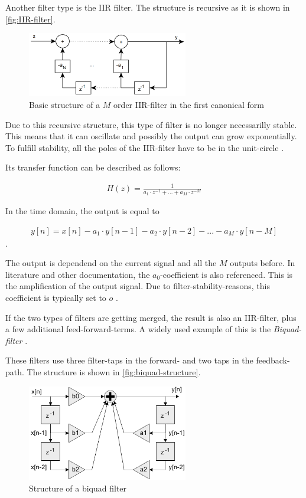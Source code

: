 Another filter type is the \ac{IIR} filter. The structure is recursive as it is shown in \autoref{fig:IIR-filter}.

\begin{figure}[!h]
    \centering
    \includegraphics[width=7cm]{img/iir.png}
    \caption{Basic structure of a $M$ order \ac{IIR}-filter in the first canonical form \cite{meyer_signalverarbeitung}}
    \label{fig:IIR-filter}
\end{figure}

Due to this recursive structure, this type of filter is no longer necessarilly stable. This means that it can
oscillate and possibly the output can grow exponentially. To fulfill stability, all the poles of the
\ac{IIR}-filter have to be in the unit-circle \cite{meyer_signalverarbeitung}.

Its transfer function can be described as follows:

\begin{align}
    H(z) = \frac{1}{a_1 \cdot z^{-1} + ... + a_M \cdot z^{-M}}
\end{align}

In the time domain, the output is equal to

\begin{align}
    y[n] = x[n] - a_1 \cdot y[n-1] - a_2 \cdot y[n-2] - ... - a_M \cdot y[n-M]
\end{align}
.

The output is dependend on the current signal and all the $M$ outputs before. In literature and other documentation,
the $a_0$-coefficient is also referenced. This is the amplification of the output signal. Due to filter-stability-reasons,
this coefficient is typically set to $o$ \cite{arm_dsp} \cite{cookbook_audio}.

If the two types of filters are getting merged, the result is also an \ac{IIR}-filter, plus
a few additional feed-forward-terms. A widely used example of this is the \textit{Biquad-filter} \cite{arm_dsp}.

These filters use three filter-taps in the forward- and two taps in the feedback-path. The structure
is shown in \autoref{fig:biquad-structure}.

\begin{figure}[!h]
    \centering
    \includegraphics[width=7cm]{img/biquad_structure.png}
    \caption{Structure of a biquad filter \cite{arm_dsp}}
    \label{fig:biquad-structure}
\end{figure}

